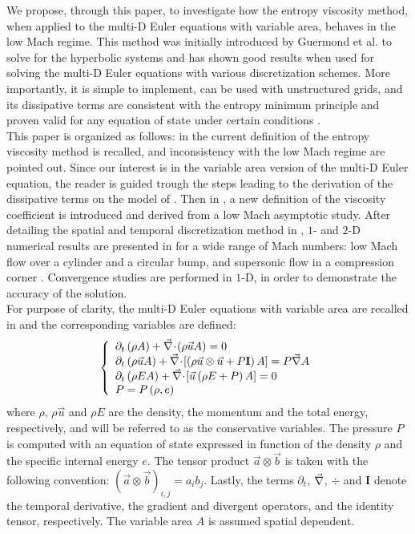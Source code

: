 We propose, through this paper, to investigate how the entropy viscosity method, when applied to the multi-D Euler equations with variable area, behaves in the low Mach regime. This method was initially introduced by Guermond et al. to solve for the hyperbolic systems and has shown good results when used for solving the multi-D Euler equations with various discretization schemes. More importantly, it is simple to implement, can be used with unstructured grids,  and its dissipative terms are consistent with the entropy minimum principle and proven valid for any equation of state under certain conditions \cite{jlg}. \\
This paper is organized as follows: in  the current definition of the entropy viscosity method is recalled, and inconsistency with the low Mach regime are pointed out. Since our interest is in the variable area version of the multi-D Euler equation, the reader is guided trough the steps leading to the derivation of the dissipative terms on the model of \cite{jlg}. Then in , a new definition of the viscosity coefficient is introduced and derived from a low Mach asymptotic study. After detailing the spatial and temporal discretization method in , $1$- and $2$-D numerical results are presented in  for a wide range of Mach numbers: low Mach flow over a cylinder and a circular bump, and supersonic flow in a compression corner \cite{CompressionCorner}. Convergence studies are performed in $1$-D, in order to demonstrate the accuracy of the solution. \\
For purpose of clarity, the multi-D Euler equations with variable area are recalled in  and the corresponding variables are defined:
\begin{equation}
\label{eq:euler_eq}
\left\{ 
\begin{array}{lll}
\partial_t \left( \rho A\right) + \vec{\nabla}\! \cdot \! \left( \rho \vec{u} A\right) = 0\\
\partial_t \left( \rho \vec{u} A\right) + \vec{\nabla}\! \cdot \! \left[ \left( \rho \vec{u} \otimes \vec{u} + P \mathbf{I} \right) A \right] = P \vec{\nabla} A\\
\partial_t \left( \rho E A\right) + \vec{\nabla}\! \cdot \! \left[ \vec{u} \left( \rho E + P \right) A\right] = 0 \\
P = P\left( \rho, e \right)
\end{array}
\right.
\end{equation}
where $\rho$, $\rho \vec{u}$ and $\rho E$ are the density, the momentum and the total energy, respectively, and will be referred to as the conservative variables. The pressure $P$ is computed with an equation of state expressed in function of the density $\rho$ and the specific internal energy $e$. The tensor product $\vec{a} \otimes \vec{b}$ is taken with the following convention: $(\vec{a} \otimes \vec{b})_{i,j} = a_i b_j$. Lastly, the terms $\partial_t$, $\vec{\nabla}$, $\div$ and $\mathbf{I}$ denote the temporal derivative, the gradient and divergent operators, and the identity tensor, respectively. The variable area $A$ is assumed spatial dependent.
